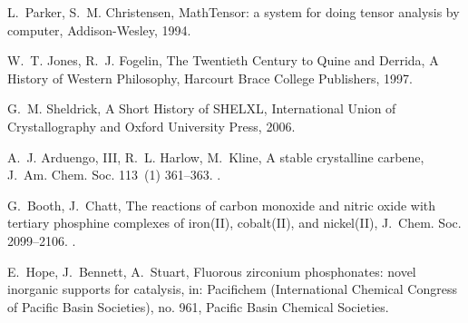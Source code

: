 \documentclass[60x84/16,8pt]{ittmm}
\begin{document}
{%






\begin{thebibliography}{99}

L.~Parker, S.~M. Christensen, MathTensor: a system for doing tensor analysis by
  computer, Addison-Wesley, 1994.

W.~T. Jones, R.~J. Fogelin, The Twentieth Century to Quine and Derrida, A
  History of Western Philosophy, Harcourt Brace College Publishers, 1997.

G.~M. Sheldrick, A Short History of SHELXL, International Union of
  Crystallography and Oxford University Press, 2006.

A.~J. Arduengo, III, R.~L. Harlow, M.~Kline, A stable crystalline carbene,
  J.~Am. Chem. Soc. 113~(1)  361--363.
\newblock \href {http://dx.doi.org/10.1021/ja00001a054}
  {}.

G.~Booth, J.~Chatt, The reactions of carbon monoxide and nitric oxide with
  tertiary phosphine complexes of iron({II}), cobalt({II}), and nickel({II}),
  J.~Chem. Soc.  2099--2106. \href {http://dx.doi.org/10.1039/JR9620002099}
  {}.

E.~Hope, J.~Bennett, A.~Stuart, Fluorous zirconium phosphonates: novel
  inorganic supports for catalysis, in: Pacifichem (International Chemical
  Congress of Pacific Basin Societies), no. 961, Pacific Basin Chemical
  Societies.

\end{thebibliography}

% 
% 

\makealttitle

} %
\end{document}
